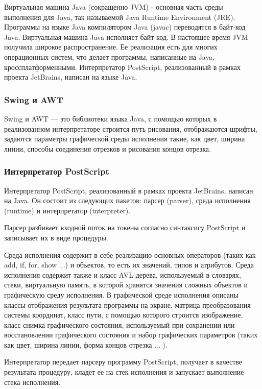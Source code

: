 \documentclass[14pt]{extarticle}
\begin{document}
		Виртуальная машина Java (сокращенно JVM) - основная часть среды выполнения для Java, так называемой Java Runtime Environment (JRE). Программы на языке Java компилятором Java (javac) переводятся в байт-код Java. Виртуальная машина Java исполняет байт-код. В настоящее время JVM получила широкое распространение. Ее реализация есть для многих операционных систем, что делает программы, написанные на Java, кроссплатформенными. Интерпретатор PostScript, реализованный в рамках проекта JetBrains, написан на языке Java.
		\subsubsection*{Swing и AWT}
		Swing и AWT --- это библиотеки языка Java, с помощью которых в реализованном интерпретаторе строится путь рисования, отображаются шрифты, задаются параметры графической среды исполнения такие, как цвет, ширина линии, способы соединения отрезков и рисования концов отрезка. 
		\subsubsection*{ Интерпретатор PostScript }
		Интерпретатор PostScript, реализованный в рамках проекта JetBrains, написан на Java. Он состоит из следующих пакетов: парсер (parser), среда исполнения (runtime) и интерпретатор (interpreter). 
		
		Парсер разбивает входной поток на токены согласно синтаксису PostScript и записывает их в виде процедуры.
		
		Среда исполнения содержит в себе реализацию основных операторов (таких как add, if, for, show ...) и объектов, то есть их значений, типов и атрибутов. Среда исполнения содержит также и класс AVL-дерева, используемый в словарях, стеки, виртуальную память, в которой хранятся значения сложных объектов и графическую среду исполнения. В графической среде исполнения описаны классы отображения результата программы на экране, матрица преобразования системы координат, класс пути, с помощью которого строится изображение, класс снимка графического состояния, используемый при сохранении или восстановлении графического состояния и набор графических параметров (таких как цвет, ширина линии, форма концов отрезка ... ).
		
		Интерпретатор передает парсеру программу PostScript, получает в качестве результата процедуру, кладет ее на стек исполнения и запускает выполнение стека исполнения.
		
\end{document}
